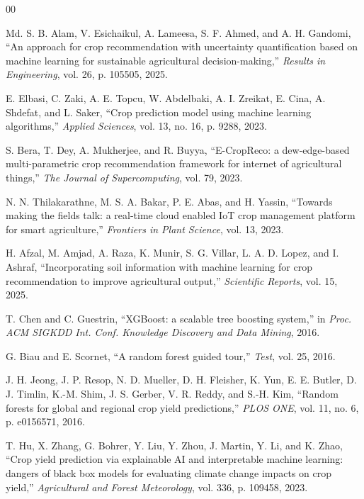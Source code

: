 \documentclass[conference]{IEEEtran}
\begin{document}
\begin{thebibliography}{00}

 Md. S. B. Alam, V. Esichaikul, A. Lameesa, S. F. Ahmed, and
A. H. Gandomi, ``An approach for crop recommendation with uncertainty quantification
based on machine learning for sustainable agricultural decision-making,'' \emph{Results
in Engineering}, vol. 26, p. 105505, 2025.

 E. Elbasi, C. Zaki, A. E. Topcu, W. Abdelbaki, A. I. Zreikat,
E. Cina, A. Shdefat, and L. Saker, ``Crop prediction model using machine learning
algorithms,'' \emph{Applied Sciences}, vol. 13, no. 16, p. 9288, 2023.

 S. Bera, T. Dey, A. Mukherjee, and R. Buyya, ``E-CropReco: a
dew-edge-based multi-parametric crop recommendation framework for internet of
agricultural things,'' \emph{The Journal of Supercomputing}, vol. 79, 2023.

 N. N. Thilakarathne, M. S. A. Bakar, P. E. Abas, and
H. Yassin, ``Towards making the fields talk: a real-time cloud enabled IoT crop
management platform for smart agriculture,'' \emph{Frontiers in Plant Science},
vol. 13, 2023.

 H. Afzal, M. Amjad, A. Raza, K. Munir, S. G. Villar,
L. A. D. Lopez, and I. Ashraf, ``Incorporating soil information with machine learning
for crop recommendation to improve agricultural output,'' \emph{Scientific Reports},
vol. 15, 2025.

 T. Chen and C. Guestrin, ``XGBoost: a scalable tree boosting
system,'' in \emph{Proc. ACM SIGKDD Int. Conf. Knowledge Discovery and Data Mining},
2016.

 G. Biau and E. Scornet, ``A random forest guided tour,''
\emph{Test}, vol. 25, 2016.

 J. H. Jeong, J. P. Resop, N. D. Mueller, D. H. Fleisher, K. Yun,
E. E. Butler, D. J. Timlin, K.-M. Shim, J. S. Gerber, V. R. Reddy, and S.-H. Kim,
``Random forests for global and regional crop yield predictions,'' \emph{PLOS ONE},
vol. 11, no. 6, p. e0156571, 2016.

 T. Hu, X. Zhang, G. Bohrer, Y. Liu, Y. Zhou, J. Martin, Y. Li, and
K. Zhao, ``Crop yield prediction via explainable AI and interpretable machine
learning: dangers of black box models for evaluating climate change impacts on crop
yield,'' \emph{Agricultural and Forest Meteorology}, vol. 336, p. 109458, 2023.


\end{thebibliography}
\end{document}
